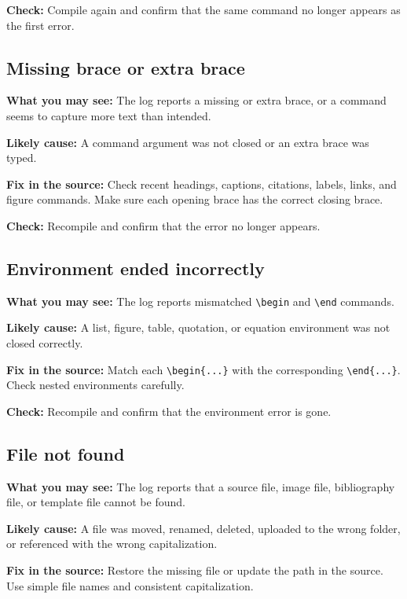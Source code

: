 \textbf{Check:} Compile again and confirm that the same command no longer appears as the first error.

\subsection{Missing brace or extra brace}
\label{subsec:missing-extra-brace}

\textbf{What you may see:} The log reports a missing or extra brace, or a command seems to capture more text than intended.

\textbf{Likely cause:} A command argument was not closed or an extra brace was typed.

\textbf{Fix in the source:} Check recent headings, captions, citations, labels, links, and figure commands. Make sure each opening brace has the correct closing brace.

\textbf{Check:} Recompile and confirm that the error no longer appears.

\subsection{Environment ended incorrectly}
\label{subsec:environment-ended-incorrectly}

\textbf{What you may see:} The log reports mismatched \verb|\begin| and \verb|\end| commands.

\textbf{Likely cause:} A list, figure, table, quotation, or equation environment was not closed correctly.

\textbf{Fix in the source:} Match each \verb|\begin{...}| with the corresponding \verb|\end{...}|. Check nested environments carefully.

\textbf{Check:} Recompile and confirm that the environment error is gone.

\subsection{File not found}
\label{subsec:file-not-found-error}

\textbf{What you may see:} The log reports that a source file, image file, bibliography file, or template file cannot be found.

\textbf{Likely cause:} A file was moved, renamed, deleted, uploaded to the wrong folder, or referenced with the wrong capitalization.

\textbf{Fix in the source:} Restore the missing file or update the path in the source. Use simple file names and consistent capitalization.

